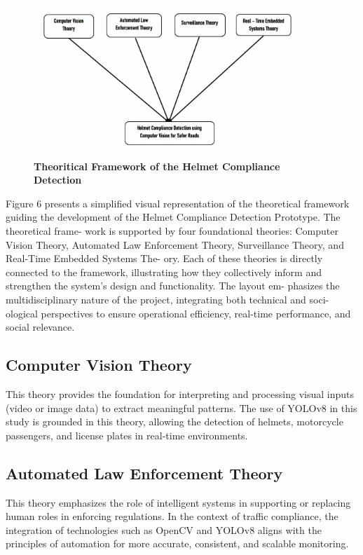 \begin{refsection}
\begin{figure}[H]
    \centering
    \includegraphics[width=0.9\textwidth]{figures/Fig 6.jpg}
    \caption{\textbf{Theoritical Framework of the Helmet Compliance Detection }}
    \label{figures/Fig 6.jpg}
\end{figure}
Figure 6 presents a simplified visual representation of the theoretical framework guiding the development of the Helmet Compliance Detection Prototype. The theoretical frame- work is supported by four foundational theories: Computer Vision Theory, Automated Law Enforcement Theory, Surveillance Theory, and Real-Time Embedded Systems The- ory. Each of these theories is directly connected to the framework, illustrating how they collectively inform and strengthen the system’s design and functionality. The layout em- phasizes the multidisciplinary nature of the project, integrating both technical and soci- ological perspectives to ensure operational efficiency, real-time performance, and social relevance.


\subsection{Computer Vision Theory}
This theory provides the foundation for interpreting and processing visual inputs (video or image data) to extract meaningful patterns. The use of YOLOv8 in this study is grounded in this theory, allowing the detection of helmets, motorcycle passengers, and license plates in real-time environments.


\subsection{Automated Law Enforcement Theory}
This theory emphasizes the role of intelligent systems in supporting or replacing human roles in enforcing regulations. In the context of traffic compliance, the integration of technologies such as OpenCV and YOLOv8 aligns with the principles of automation for more accurate, consistent, and scalable monitoring.



\end{refsection}
